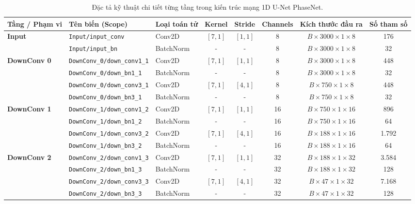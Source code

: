 \documentclass[preprint,1p]{elsarticle}
\begin{document}
\begin{table}[htbp]
\centering
\scriptsize
\caption{Đặc tả kỹ thuật chi tiết từng tầng trong kiến trúc mạng 1D U-Net PhaseNet.}
\label{tab:phasenet_layers}
\begin{tabular}{lllccccc}
\toprule
\textbf{Tầng / Phạm vi} & \textbf{Tên biến (Scope)} & \textbf{Loại toán tử} & \textbf{Kernel} & \textbf{Stride} & \textbf{Channels} & \textbf{Kích thước đầu ra} & \textbf{Số tham số} \\
\midrule
\textbf{Input} & \texttt{Input/input\_conv} & Conv2D & $[7, 1]$ & $[1, 1]$ & 8 & $B \times 3000 \times 1 \times 8$ & 176 \\
& \texttt{Input/input\_bn} & BatchNorm & - & - & 8 & $B \times 3000 \times 1 \times 8$ & 32 \\
\midrule
\textbf{DownConv 0} & \texttt{DownConv\_0/down\_conv1\_1} & Conv2D & $[7, 1]$ & $[1, 1]$ & 8 & $B \times 3000 \times 1 \times 8$ & 448 \\
& \texttt{DownConv\_0/down\_bn1\_1} & BatchNorm & - & - & 8 & $B \times 3000 \times 1 \times 8$ & 32 \\
& \texttt{DownConv\_0/down\_conv3\_1} & Conv2D & $[7, 1]$ & $[4, 1]$ & 8 & $B \times 750 \times 1 \times 8$ & 448 \\
& \texttt{DownConv\_0/down\_bn3\_1} & BatchNorm & - & - & 8 & $B \times 750 \times 1 \times 8$ & 32 \\
\midrule
\textbf{DownConv 1} & \texttt{DownConv\_1/down\_conv1\_2} & Conv2D & $[7, 1]$ & $[1, 1]$ & 16 & $B \times 750 \times 1 \times 16$ & 896 \\
& \texttt{DownConv\_1/down\_bn1\_2} & BatchNorm & - & - & 16 & $B \times 750 \times 1 \times 16$ & 64 \\
& \texttt{DownConv\_1/down\_conv3\_2} & Conv2D & $[7, 1]$ & $[4, 1]$ & 16 & $B \times 188 \times 1 \times 16$ & 1.792 \\
& \texttt{DownConv\_1/down\_bn3\_2} & BatchNorm & - & - & 16 & $B \times 188 \times 1 \times 16$ & 64 \\
\midrule
\textbf{DownConv 2} & \texttt{DownConv\_2/down\_conv1\_3} & Conv2D & $[7, 1]$ & $[1, 1]$ & 32 & $B \times 188 \times 1 \times 32$ & 3.584 \\
& \texttt{DownConv\_2/down\_bn1\_3} & BatchNorm & - & - & 32 & $B \times 188 \times 1 \times 32$ & 128 \\
& \texttt{DownConv\_2/down\_conv3\_3} & Conv2D & $[7, 1]$ & $[4, 1]$ & 32 & $B \times 47 \times 1 \times 32$ & 7.168 \\
& \texttt{DownConv\_2/down\_bn3\_3} & BatchNorm & - & - & 32 & $B \times 47 \times 1 \times 32$ & 128 \\

\end{tabular}
\end{table}
\end{document}
